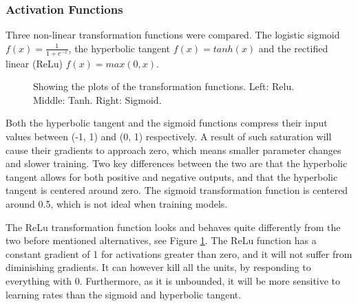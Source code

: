 \documentclass[]{article}
\begin{document}
\subsubsection{Activation Functions}

Three non-linear transformation functions were compared. The logistic sigmoid $f(x)=\frac{1}{1+e^{-x}}$, the hyperbolic tangent $f(x)=tanh(x)$ and the rectified linear (ReLu) $f(x)=max(0,x)$.

\begin{figure}[h]
	\centering
	\caption{Showing the plots of the transformation functions. Left: Relu. Middle: Tanh. Right: Sigmoid.}
	\label{part1-plots}
\end{figure}

Both the hyperbolic tangent and the sigmoid functions compress their input values between (-1, 1) and (0, 1) respectively. A result of such saturation will cause their gradients to approach zero, which means smaller parameter changes and slower training. Two key differences between the two are that the hyperbolic tangent allows for both positive and negative outputs, and that the hyperbolic tangent is centered around zero. The sigmoid transformation function is centered around 0.5, which is not ideal when training models.

The ReLu transformation function looks and behaves quite differently from the two before mentioned alternatives, see Figure \ref{part1-plots}. The ReLu function has a constant gradient of 1 for activations greater than zero, and it will not suffer from diminishing gradients. It can however kill all the units, by responding to everything with 0. Furthermore, as it is unbounded, it will be more sensitive to learning rates than the sigmoid and hyperbolic tangent.
\end{document}
